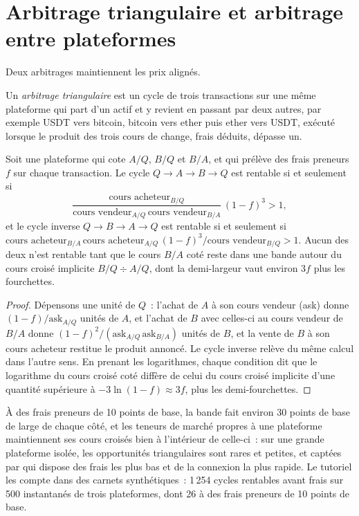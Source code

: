 \section{Arbitrage triangulaire et arbitrage entre plateformes}

Deux arbitrages maintiennent les prix alignés.

\begin{definition}\label{def:m3:spot-markets:tri}
Un \emph{arbitrage triangulaire} est un cycle de trois transactions sur une même plateforme qui part d'un actif
et y revient en passant par deux autres, par exemple USDT vers bitcoin, bitcoin vers ether puis ether vers USDT, exécuté lorsque le produit
des trois cours de change, frais déduits, dépasse un.
\end{definition}

\begin{proposition}\label{prop:m3:spot-markets:band}
Soit une plateforme qui cote $A/Q$, $B/Q$ et $B/A$, et qui prélève des frais preneurs $f$ sur chaque transaction. Le cycle
$Q \to A \to B \to Q$ est rentable si et seulement si
\[
\frac{\text{cours acheteur}_{B/Q}}{\text{cours vendeur}_{A/Q}\,\text{cours vendeur}_{B/A}}\,(1 - f)^3 > 1,
\]
et le cycle inverse $Q \to B \to A \to Q$ est rentable si et seulement si
$\text{cours acheteur}_{B/A}\,\text{cours acheteur}_{A/Q}\,(1 - f)^3 / \text{cours vendeur}_{B/Q} > 1$. Aucun des deux n'est rentable tant que le cours
$B/A$ coté reste dans une bande autour du cours croisé implicite $B/Q \div A/Q$, dont la demi-largeur vaut environ $3f$
plus les fourchettes.
\end{proposition}

\begin{proof}
Dépensons une unité de $Q$~: l'achat de $A$ à son cours vendeur (ask) donne $(1-f)/\text{ask}_{A/Q}$ unités de $A$, et l'achat de $B$ avec celles-ci
au cours vendeur de $B/A$ donne $(1-f)^2/(\text{ask}_{A/Q}\,\text{ask}_{B/A})$ unités de $B$, et la vente de $B$ à son cours acheteur restitue le produit annoncé.
Le cycle inverse relève du même calcul dans l'autre sens. En prenant les logarithmes, chaque condition dit que le logarithme du cours croisé coté
diffère de celui du cours croisé implicite d'une quantité supérieure à
$-3\ln(1-f) \approx 3f$, plus les demi-fourchettes.
\end{proof}

À des frais preneurs de 10 points de base, la bande fait environ 30 points de base de large de chaque côté, et les teneurs de marché propres à une plateforme
maintiennent ses cours croisés bien à l'intérieur de celle-ci~: sur une grande plateforme isolée, les opportunités triangulaires sont rares et
petites, et captées par qui dispose des frais les plus bas et de la connexion la plus rapide. Le tutoriel les compte dans des carnets synthétiques~:
1\,254 cycles rentables avant frais sur 500 instantanés de trois plateformes, dont 26 à des frais preneurs
de 10 points de base.

